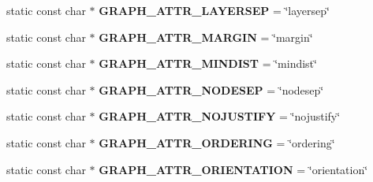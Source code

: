 \begin{DoxyCompactItemize}
\item 
static const char $\ast$ {\bfseries G\+R\+A\+P\+H\+\_\+\+A\+T\+T\+R\+\_\+\+L\+A\+Y\+E\+R\+S\+EP} = \char`\"{}layersep\char`\"{}\hypertarget{classmemgraph_1_1_graphviz_attrs_ad486fe3eac6e3953b8586ecdf978cba6}{}\label{classmemgraph_1_1_graphviz_attrs_ad486fe3eac6e3953b8586ecdf978cba6}

\item 
static const char $\ast$ {\bfseries G\+R\+A\+P\+H\+\_\+\+A\+T\+T\+R\+\_\+\+M\+A\+R\+G\+IN} = \char`\"{}margin\char`\"{}\hypertarget{classmemgraph_1_1_graphviz_attrs_a7c83294e42c42cb4501abca8855b9254}{}\label{classmemgraph_1_1_graphviz_attrs_a7c83294e42c42cb4501abca8855b9254}

\item 
static const char $\ast$ {\bfseries G\+R\+A\+P\+H\+\_\+\+A\+T\+T\+R\+\_\+\+M\+I\+N\+D\+I\+ST} = \char`\"{}mindist\char`\"{}\hypertarget{classmemgraph_1_1_graphviz_attrs_aba0a800350da43a1f2198a66c6c49995}{}\label{classmemgraph_1_1_graphviz_attrs_aba0a800350da43a1f2198a66c6c49995}

\item 
static const char $\ast$ {\bfseries G\+R\+A\+P\+H\+\_\+\+A\+T\+T\+R\+\_\+\+N\+O\+D\+E\+S\+EP} = \char`\"{}nodesep\char`\"{}\hypertarget{classmemgraph_1_1_graphviz_attrs_ad5cfa00d6fd72da953f1dce1c158d052}{}\label{classmemgraph_1_1_graphviz_attrs_ad5cfa00d6fd72da953f1dce1c158d052}

\item 
static const char $\ast$ {\bfseries G\+R\+A\+P\+H\+\_\+\+A\+T\+T\+R\+\_\+\+N\+O\+J\+U\+S\+T\+I\+FY} = \char`\"{}nojustify\char`\"{}\hypertarget{classmemgraph_1_1_graphviz_attrs_adc6c0dc855d4b1e80925ce84970243a6}{}\label{classmemgraph_1_1_graphviz_attrs_adc6c0dc855d4b1e80925ce84970243a6}

\item 
static const char $\ast$ {\bfseries G\+R\+A\+P\+H\+\_\+\+A\+T\+T\+R\+\_\+\+O\+R\+D\+E\+R\+I\+NG} = \char`\"{}ordering\char`\"{}\hypertarget{classmemgraph_1_1_graphviz_attrs_a74882d068423192804a25a29b51577ae}{}\label{classmemgraph_1_1_graphviz_attrs_a74882d068423192804a25a29b51577ae}

\item 
static const char $\ast$ {\bfseries G\+R\+A\+P\+H\+\_\+\+A\+T\+T\+R\+\_\+\+O\+R\+I\+E\+N\+T\+A\+T\+I\+ON} = \char`\"{}orientation\char`\"{}\hypertarget{classmemgraph_1_1_graphviz_attrs_a4da85de335a87309793e5ab24e655d13}{}\label{classmemgraph_1_1_graphviz_attrs_a4da85de335a87309793e5ab24e655d13}


\end{DoxyCompactItemize}
